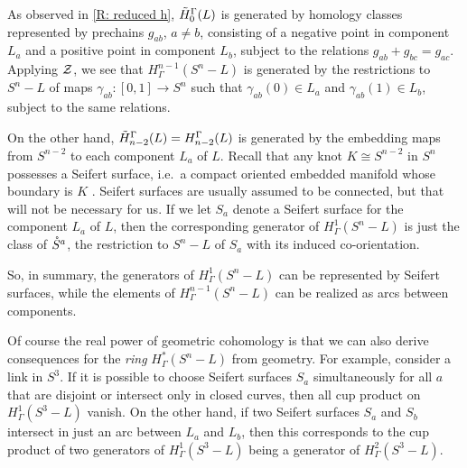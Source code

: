 As observed in \cref{R: reduced h}, $\tilde H_0^\Gamma(L)$ is generated by homology classes represented by prechains $g_{ab}$, $a \neq b$, consisting of a negative point in component $L_a$ and a positive point in component $L_b$, subject to the relations $g_{ab}+g_{bc}=g_{ac}$.
Applying $\mathcal{Z}$, we see that $H^{n-1}_\Gamma(S^n - L)$ is generated by the restrictions to $S^n-L$ of maps $\gamma_{ab} \colon [0,1] \to S^n$ such that $\gamma_{ab}(0) \in L_a$ and $\gamma_{ab}(1) \in L_b$, subject to the same relations.

On the other hand, $\tilde H_{n-2}^\Gamma(L) = H_{n-2}^\Gamma(L)$ is generated by the embedding maps from $S^{n-2}$ to each component $L_a$ of $L$.
Recall that any knot $K \cong S^{n-2}$ in $S^n$ possesses a Seifert surface, i.e.\ a compact oriented embedded manifold whose boundary is $K$ \cite[Appendix B]{MC17}.
Seifert surfaces are usually assumed to be connected, but that will not be necessary for us.
If we let $S_a$ denote a Seifert surface for the component $L_a$ of $L$, then the corresponding generator of $H^1_\Gamma(S^n - L)$ is just the class of $\mathring{S}^a$, the restriction to $S^n - L$ of $S_a$ with its induced co-orientation.

So, in summary, the generators of $H^1_\Gamma(S^n - L)$ can be represented by Seifert surfaces, while the elements of $H^{n-1}_\Gamma(S^n - L)$ can be realized as arcs between components.

Of course the real power of geometric cohomology is that we can also derive consequences for the {\it ring} $H^*_\Gamma(S^n-L)$ from geometry.
For example, consider a link in $S^3$.
If it is possible to choose Seifert surfaces $S_a$ simultaneously for all $a$ that are disjoint or intersect only in closed curves, then all cup product on $H^1_\Gamma(S^3-L)$ vanish.
On the other hand, if two Seifert surfaces $S_a$ and $S_b$ intersect in just an arc between $L_a$ and $L_b$, then this corresponds to the cup product of two generators of $H^1_\Gamma(S^3-L)$ being a generator of $H^2_\Gamma(S^3-L)$.


